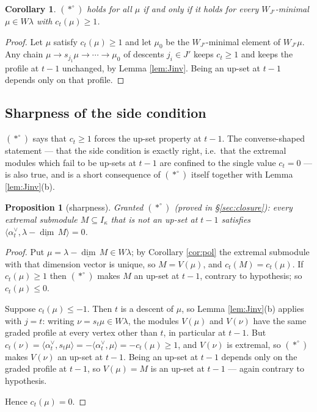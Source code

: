 \documentclass[reqno]{amsart}
\theoremstyle{plain}
\newtheorem{proposition}[theorem]{Proposition}
\newtheorem{corollary}[theorem]{Corollary}
\theoremstyle{definition}
\newcommand{\dimv}{\underline{\dim}\,}
\newcommand{\la}{\lambda}
\newcommand{\al}{\alpha}
\newcommand{\ka}{\kappa}
\begin{document}
\begin{corollary}\label{cor:reduce}
$(*^\circ)$ holds for all $\mu$ if and only if it holds for every
$W_{J'}$-minimal $\mu\in W\la$ with $c_t(\mu)\ge1$.
\end{corollary}

\begin{proof}
Let $\mu$ satisfy $c_t(\mu)\ge1$ and let $\mu_0$ be the $W_{J'}$-minimal
element of $W_{J'}\mu$.  Any chain $\mu\to s_{j_1}\mu\to\cdots\to\mu_0$ of
descents $j_i\in J'$ keeps $c_t\ge1$ and keeps the profile at $t-1$ unchanged,
by Lemma \ref{lem:Jinv}.  Being an up-set at $t-1$ depends only on that
profile.
\end{proof}

\subsection{Sharpness of the side condition}\label{ss:sharp}

$(*^\circ)$ says that $c_t\ge1$ forces the up-set property at $t-1$.  The
converse-shaped statement --- that the side condition is exactly right, i.e.\
that the extremal modules which fail to be up-sets at $t-1$ are confined to the
single value $c_t=0$ --- is also true, and is a short consequence of
$(*^\circ)$ itself together with Lemma \ref{lem:Jinv}(b).

\begin{proposition}[sharpness]\label{prop:sharp}
Granted $(*^\circ)$ \textup{(}proved in \S\ref{sec:closure}\textup{)}: every
extremal submodule $M\subseteq I_\ka$ that is \emph{not} an up-set at $t-1$
satisfies $\langle\al_t^\vee,\la-\dimv M\rangle=0$.
\end{proposition}

\begin{proof}
Put $\mu=\la-\dimv M\in W\la$; by Corollary \ref{cor:pol} the extremal
submodule with that dimension vector is unique, so $M=V(\mu)$, and
$c_t(M)=c_t(\mu)$.  If $c_t(\mu)\ge1$ then $(*^\circ)$ makes $M$ an up-set at
$t-1$, contrary to hypothesis; so $c_t(\mu)\le0$.

Suppose $c_t(\mu)\le-1$.  Then $t$ is a descent of $\mu$, so Lemma
\ref{lem:Jinv}(b) applies with $j=t$: writing $\nu=s_t\mu\in W\la$, the modules
$V(\mu)$ and $V(\nu)$ have the same graded profile at every vertex other than
$t$, in particular at $t-1$.  But
$c_t(\nu)=\langle\al_t^\vee,s_t\mu\rangle=-\langle\al_t^\vee,\mu\rangle
=-c_t(\mu)\ge1$, and $V(\nu)$ is extremal, so $(*^\circ)$ makes $V(\nu)$ an
up-set at $t-1$.  Being an up-set at $t-1$ depends only on the graded profile
at $t-1$, so $V(\mu)=M$ is an up-set at $t-1$ --- again contrary to hypothesis.

Hence $c_t(\mu)=0$.
\end{proof}
\end{document}

